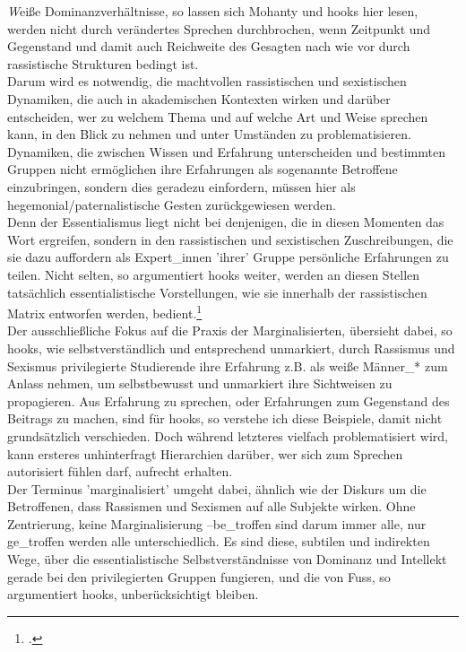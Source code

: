 \noindent \textit{W}eiße Dominanzverhältnisse, so lassen sich Mohanty und hooks hier lesen, werden
nicht durch verändertes Sprechen durchbrochen, wenn Zeitpunkt und Gegenstand
und damit auch Reichweite des Gesagten nach wie vor durch rassistische
Strukturen bedingt ist.\\
Darum wird es notwendig, die machtvollen rassistischen und sexistischen
Dynamiken, die auch in akademischen Kontexten wirken und darüber entscheiden,
wer zu welchem Thema und auf welche Art und Weise sprechen kann, in den Blick
zu nehmen und unter Umständen zu problematisieren. Dynamiken, die zwischen
Wissen und Erfahrung unterscheiden und bestimmten Gruppen nicht ermöglichen
ihre Erfahrungen als sogenannte Betroffene einzubringen, sondern dies geradezu
einfordern, müssen hier als hegemonial/paternalistische Gesten zurückgewiesen
werden.\\
Denn der Essentialismus liegt nicht bei denjenigen, die in diesen Momenten das
Wort ergreifen, sondern in den rassistischen und sexistischen Zuschreibungen,
die sie dazu auffordern als Expert\_innen 'ihrer' Gruppe persönliche Erfahrungen
zu teilen. Nicht selten, so argumentiert hooks weiter, werden an diesen Stellen
tatsächlich essentialistische Vorstellungen, wie sie innerhalb der
rassistischen Matrix entworfen werden,
bedient.\footnotemark\footcitetext[81]{bellhooks}\\

Der ausschließliche Fokus auf die Praxis der Marginalisierten, übersieht dabei,
so hooks, wie selbstverständlich und entsprechend unmarkiert, durch Rassismus
und Sexismus privilegierte Studierende ihre Erfahrung z.B. als weiße Männer\_*
zum Anlass nehmen, um selbstbewusst und unmarkiert ihre Sichtweisen zu
propagieren. Aus Erfahrung zu sprechen, oder Erfahrungen zum Gegenstand des
Beitrags zu machen, sind für hooks, so verstehe ich diese Beispiele, damit
nicht grundsätzlich verschieden. Doch während letzteres vielfach
problematisiert wird, kann ersteres unhinterfragt Hierarchien darüber, wer sich
zum Sprechen autorisiert fühlen darf, aufrecht
erhalten.\footnotemark{}\\
Der Terminus 'marginalisiert' umgeht dabei, ähnlich wie der Diskurs um die
Betroffenen, dass Rassismen und Sexismen auf alle Subjekte wirken. Ohne
Zentrierung, keine Marginalisierung –be\_troffen sind darum immer alle, nur
ge\_troffen werden alle unterschiedlich.  Es sind diese, subtilen und indirekten
Wege, über die essentialistische Selbstverständnisse von Dominanz und Intellekt
gerade bei den privilegierten Gruppen fungieren, und die von Fuss, so
argumentiert hooks, unberücksichtigt bleiben.\\

